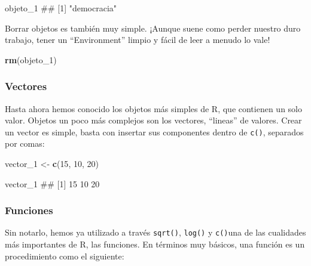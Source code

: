 \documentclass[]{book}
\newenvironment{Shaded}{\begin{snugshade}}{\end{snugshade}}
\newcommand{\KeywordTok}[1]{\textcolor[rgb]{0.13,0.29,0.53}{\textbf{#1}}}
\newcommand{\DecValTok}[1]{\textcolor[rgb]{0.00,0.00,0.81}{#1}}
\newcommand{\StringTok}[1]{\textcolor[rgb]{0.31,0.60,0.02}{#1}}
\newcommand{\NormalTok}[1]{#1}
\begin{document}
\begin{Shaded}
\begin{Highlighting}[]
\NormalTok{objeto_}\DecValTok{1} 
\NormalTok{## [1] "democracia"}
\end{Highlighting}
\end{Shaded}

Borrar objetos es también muy simple. ¡Aunque suene como perder nuestro
duro trabajo, tener un ``Environment'' limpio y fácil de leer a menudo
lo vale!

\begin{Shaded}
\begin{Highlighting}[]
\KeywordTok{rm}\NormalTok{(objeto_}\DecValTok{1}\NormalTok{)}
\end{Highlighting}
\end{Shaded}

\subsubsection{Vectores}\label{vectores}

Hasta ahora hemos conocido los objetos más simples de R, que contienen
un solo valor. Objetos un poco más complejos son los vectores,
``lineas'' de valores. Crear un vector es simple, basta con insertar sus
componentes dentro de \texttt{c()}, separados por comas:

\begin{Shaded}
\begin{Highlighting}[]
\NormalTok{vector_}\DecValTok{1}\NormalTok{ <-}\StringTok{ }\KeywordTok{c}\NormalTok{(}\DecValTok{15}\NormalTok{, }\DecValTok{10}\NormalTok{, }\DecValTok{20}\NormalTok{)}
\end{Highlighting}
\end{Shaded}

\begin{Shaded}
\begin{Highlighting}[]
\NormalTok{vector_}\DecValTok{1}
\NormalTok{## [1] 15 10 20}
\end{Highlighting}
\end{Shaded}

\subsubsection{Funciones}\label{funciones}

Sin notarlo, hemos ya utilizado a través \texttt{sqrt()}, \texttt{log()}
y \texttt{c()}una de las cualidades más importantes de R, las funciones.
En términos muy básicos, una función es un procedimiento como el
siguiente:
\end{document}
